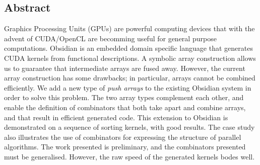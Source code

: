 

\subsection*{Abstract}
Graphics Processing Units (GPUs) are powerful computing devices 
that with the advent of CUDA/OpenCL are becomming useful for general 
purpose computations. 
Obsidian is an embedded domain specific language that generates CUDA kernels
from functional descriptions.
A symbolic array construction allows us to guarantee that intermediate
arrays are fused away. However, the current array construction has
some drawbacks; in particular, arrays cannot be combined efficiently.
We add a new type of {\em push arrays} to the existing Obsidian system in 
order to solve this problem. The two array types complement each other,
and enable the definition of combinators that both
take apart and combine arrays, and that result in efficient generated code.
This extension to Obsidian is demonstrated on a sequence of
sorting kernels, with good results.
The case study also illustrates the use of combinators for expressing
the structure of parallel algorithms.
The work presented is preliminary, and 
the combinators presented must be generalised.
However, the raw speed of the generated kernels bodes well.
